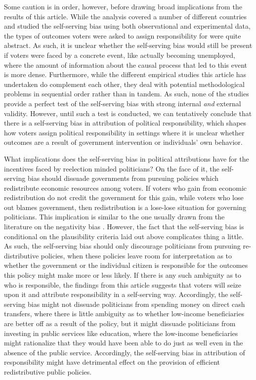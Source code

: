 \documentclass[a4paper,11pt]{article}
\begin{document}
	Some caution is in order, however, before drawing broad implications from the results of this article. While the analysis covered a number of different countries and studied the self-serving bias using both observational and experimental data, the types of outcomes voters were asked to assign responsibility for were quite abstract. As such, it is unclear whether the self-serving bias would still be present if voters were faced by a concrete event, like actually becoming unemployed, where the amount of information about the causal process that led to this event is more dense. Furthermore, while the different empirical studies this article has undertaken do complement each other, they deal with potential methodological problems in sequential order rather than in tandem. As such, none of the studies provide a perfect test of the self-serving bias with strong internal \textit{and} external validity. However, until such a test is conducted, we can tentatively conclude that there is a self-serving bias in attribution of political responsibility, which shapes how voters assign political responsibility in settings where it is unclear whether outcomes are a result of government intervention or individuals' own behavior.
	
	
	What implications does the self-serving bias in political attributions have for the incentives faced by reelection minded politicians? On the face of it, the self-serving bias should dissuade governments from pursuing policies which redistribute economic resources among voters. If voters who gain from economic redistribution do not credit the government for this gain, while voters who lose out blames government, then redistribution is a lose-lose situation for governing politicians. This implication is similar to the one usually drawn from the literature on the negativity bias \citep[e.g.,][]{hood2011blame,nielsen2017politicians,weaver1986politics}. However, the fact that the self-serving bias is conditional on the plausibility criteria laid out above complicates thing a little. As such, the self-serving bias should only discourage politicians from pursuing re-distributive policies, when these policies leave room for interpretation as to whether the government or the individual citizen is responsible for the outcomes this policy might make more or less likely. If there is any such ambiguity as to who is responsible, the findings from this article suggests that voters will seize upon it and attribute responsibility in a self-serving way. Accordingly, the self-serving bias might not dissuade politicians from spending money on direct cash transfers, where there is little ambiguity as to whether low-income beneficiaries are better off as a result of the policy, but it might dissuade politicians from investing in public services like education, where the low-income beneficiaries might rationalize that they would have been able to do just as well even in the absence of the public service. Accordingly, the self-serving bias in attribution of responsibility might have detrimental effect on the provision of efficient redistributive public policies.
	
\end{document}
